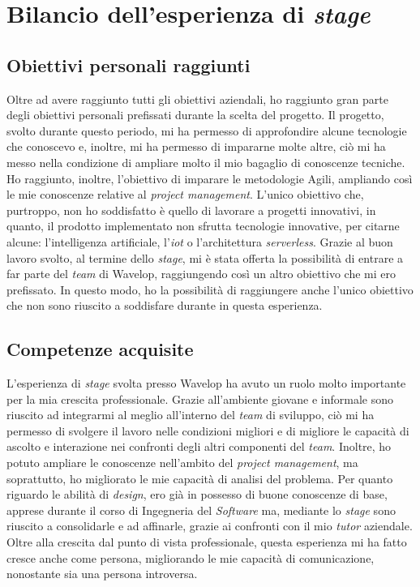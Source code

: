 \section{Bilancio dell'esperienza di \emph{stage}}

\subsection{Obiettivi personali raggiunti}
Oltre ad avere raggiunto tutti gli obiettivi aziendali, ho raggiunto gran parte degli obiettivi personali prefissati durante la scelta del progetto.
Il progetto, svolto durante questo periodo, mi ha permesso di approfondire alcune tecnologie che conoscevo e, inoltre, mi ha permesso di impararne molte altre, ciò mi ha messo nella condizione di ampliare molto il mio bagaglio di conoscenze tecniche. 
Ho raggiunto, inoltre, l'obiettivo di imparare le metodologie Agili, ampliando così le mie conoscenze relative al \emph{project management}.
L'unico obiettivo che, purtroppo, non ho soddisfatto è quello di lavorare a progetti innovativi, in quanto, il prodotto implementato non sfrutta tecnologie innovative, per citarne alcune: l'intelligenza artificiale, l'\emph{\acrlong{iot}} o l'architettura \emph{serverless}.
Grazie al buon lavoro svolto, al termine dello \emph{stage}, mi è stata offerta la possibilità di entrare a far parte del \emph{team} di Wavelop, raggiungendo così un altro obiettivo che mi ero prefissato.
In questo modo, ho la possibilità di raggiungere anche l'unico obiettivo che non sono riuscito a soddisfare durante in questa esperienza.

\subsection{Competenze acquisite}
L'esperienza di \emph{stage} svolta presso Wavelop ha avuto un ruolo molto importante per la mia crescita professionale.
Grazie all'ambiente giovane e informale sono riuscito ad integrarmi al meglio all'interno del \emph{team} di sviluppo, ciò mi ha permesso di svolgere il lavoro nelle condizioni migliori e di migliore le capacità di ascolto e interazione nei confronti degli altri componenti del \emph{team}.
Inoltre, ho potuto ampliare le conoscenze nell'ambito del \emph{project management}, ma soprattutto, ho migliorato le mie capacità di analisi del problema.
Per quanto riguardo le abilità di \emph{design}, ero già in possesso di buone conoscenze di base, apprese durante il corso di Ingegneria del \emph{Software} ma, mediante lo \emph{stage} sono riuscito a consolidarle e ad affinarle, grazie ai confronti con il mio \emph{tutor} aziendale.
Oltre alla crescita dal punto di vista professionale, questa esperienza mi ha fatto cresce anche come persona, migliorando le mie capacità di comunicazione, nonostante sia una persona introversa.

